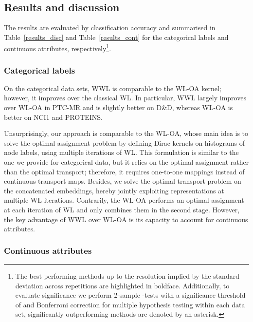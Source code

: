 \documentclass{article}
\begin{document}
\subsection{Results and discussion}
\label{sec:resdisc}

The results are evaluated by classification accuracy and summarised in Table~\ref{results_disc} and Table~\ref{results_cont} for the categorical labels and continuous attributes, respectively\footnote{
The best performing methods up to the resolution implied by the standard deviation across repetitions are highlighted in boldface. Additionally, to evaluate significance we perform 2-sample -tests with a significance threshold of  and Bonferroni correction for multiple hypothesis testing within each data set, significantly outperforming methods are denoted by an asterisk.}.

\subsubsection{Categorical labels}

On the categorical data sets, WWL is comparable to the WL-OA kernel; however, it improves over the classical WL. In particular, WWL largely improves over WL-OA in \textsc{PTC-MR} and is slightly better on \textsc{D\&D}, whereas WL-OA is better on \textsc{NCI1} and \textsc{PROTEINS}. 

Unsurprisingly,  our approach is comparable to the WL-OA, whose main idea is to solve the optimal assignment problem by defining Dirac kernels on histograms of node labels, using multiple iterations of WL. 
This formulation is similar to the one we provide for categorical data, but it relies on the optimal assignment rather than the optimal transport; therefore, it requires one-to-one mappings instead of continuous transport maps. Besides, we solve the optimal transport problem on the concatenated embeddings, hereby jointly exploiting representations at multiple WL iterations. Contrarily, the WL-OA performs an optimal assignment at each iteration of WL and only combines them in the second stage.
However, the key advantage of WWL over WL-OA is its capacity to account for continuous attributes.

\subsubsection{Continuous attributes}
\end{document}
